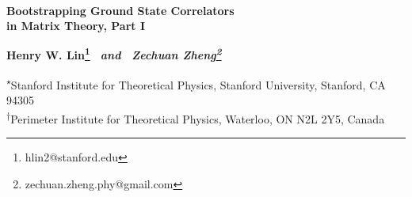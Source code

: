 \documentclass[11pt]{article}
\begin{document}
\renewcommand*{\thefootnote}{\fnsymbol{footnote}}



\thispagestyle{empty}
\begin{center}
    ~\vspace{5mm}
    
    

  {\LARGE \bf Bootstrapping Ground State Correlators\\ \vspace{0.25cm} in Matrix Theory, Part I} 

  
     
   
   \vspace{0.5in}
\begingroup\large
   {\bf Henry W. Lin\footnote{hlin2@stanford.edu} $\,$ \it{and} $\,$ \bf Zechuan Zheng\footnote{zechuan.zheng.phy@gmail.com}}
\par\endgroup
    \vspace{0.5in}

\begingroup\sffamily\footnotesize
    \textsuperscript{$\star$}Stanford Institute for Theoretical Physics, Stanford University, Stanford, CA 94305\\
   \textsuperscript{$\dagger$}Perimeter Institute for Theoretical Physics, Waterloo, ON N2L 2Y5, Canada
 \par\endgroup               
    \vspace{0.5in}
    
\end{center}

\vspace{0.5in}

\begin{abstract}
The D0-brane/Banks-Fischler-Shenker-Susskind matrix theory is a strongly coupled quantum system with an interesting gravity dual.
We develop a scheme to derive bootstrap bounds on simple correlators in the matrix theory at infinite $N$ at zero energy by imposing the supercharge equations of motion. By exploiting SO(9) symmetry, we are able to consider single-trace operators involving words of length up to 9 using very modest computational resources. We interpret our initial results as strong evidence that the bootstrap method can efficiently access  physics in the strongly coupled, infinite $N$ regime. %


\end{abstract}

\vspace{0.5cm}

\thispagestyle{empty}
\end{document}
